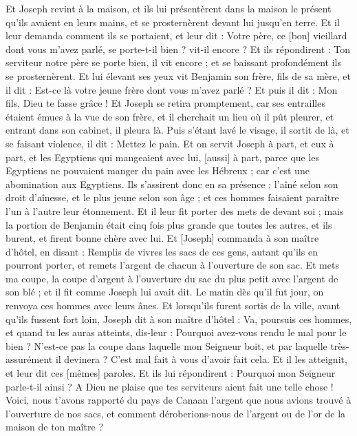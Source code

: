 \begin{multicols}{2}
Et Joseph revint à la maison, et ils lui présentèrent dans la maison le présent qu'ils avaient en leurs mains, et se prosternèrent devant lui jusqu'en terre.
Et il leur demanda comment ils se portaient, et leur dit : Votre père, ce [bon] vieillard dont vous m'avez parlé, se porte-t-il bien ? vit-il encore ?
Et ils répondirent : Ton serviteur notre père se porte bien, il vit encore ; et se baissant profondément ils se prosternèrent.
Et lui élevant ses yeux vit Benjamin son frère, fils de sa mère, et il dit : Est-ce là votre jeune frère dont vous m'avez parlé ? Et puis il dit : Mon fils, Dieu te fasse grâce !
Et Joseph se retira promptement, car ses entrailles étaient émues à la vue de son frère, et il cherchait un lieu où il pût pleurer, et entrant dans son cabinet, il pleura là.
Puis s'étant lavé le visage, il sortit de là, et se faisant violence, il dit : Mettez le pain.
Et on servit Joseph à part, et eux à part, et les Egyptiens qui mangeaient avec lui, [aussi] à part, parce que les Egyptiens ne pouvaient manger du pain avec les Hébreux ; car c'est une abomination aux Egyptiens.
Ils s'assirent donc en sa présence ; l'aîné selon son droit d'aînesse, et le plus jeune selon son âge ; et ces hommes faisaient paraître l'un à l'autre leur étonnement.
Et il leur fit porter des mets de devant soi ; mais la portion de Benjamin était cinq fois plus grande que toutes les autres, et ils burent, et firent bonne chère avec lui.
\VerseOne{}Et [Joseph] commanda à son maître d'hôtel, en disant : Remplis de vivres les sacs de ces gens, autant qu'ils en pourront porter, et remets l'argent de chacun à l'ouverture de son sac.
Et mets ma coupe, la coupe d'argent à l'ouverture du sac du plus petit avec l'argent de son blé ; et il fit comme Joseph lui avait dit.
Le matin dès qu'il fut jour, on renvoya ces hommes avec leurs ânes.
Et lorsqu'ils furent sortis de la ville, avant qu'ils fussent fort loin, Joseph dit à son maître d'hôtel : Va, poursuis ces hommes, et quand tu les auras atteints, dis-leur : Pourquoi avez-vous rendu le mal pour le bien ?
N'est-ce pas la coupe dans laquelle mon Seigneur boit, et par laquelle très-assurément il devinera ? C'est mal fait à vous d'avoir fait cela.
Et il les atteignit, et leur dit ces [mêmes] paroles.
Et ils lui répondirent : Pourquoi mon Seigneur parle-t-il ainsi ? A Dieu ne plaise que tes serviteurs aient fait une telle chose !
Voici, nous t'avons rapporté du pays de Canaan l'argent que nous avions trouvé à l'ouverture de nos sacs, et comment déroberions-nous de l'argent ou de l'or de la maison de ton maître ?

\end{multicols}
